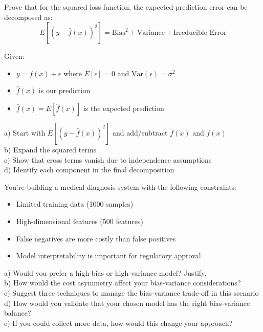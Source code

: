 \documentclass{article}
\newcounter{exercise}
\begin{document}
\begin{tcolorbox}[colback=gray!5!white,colframe=gray!75!black,title=Problem \stepcounter{exercise}: Derivation Challenge]

Prove that for the squared loss function, the expected prediction error can be decomposed as:
$$E[(y - \hat{f}(x))^2] = \text{Bias}^2 + \text{Variance} + \text{Irreducible Error}$$

Given:
\begin{itemize}
    \item $y = f(x) + \epsilon$ where $E[\epsilon] = 0$ and $\text{Var}(\epsilon) = \sigma^2$
    \item $\hat{f}(x)$ is our prediction
    \item $\bar{f}(x) = E[\hat{f}(x)]$ is the expected prediction
\end{itemize}

a) Start with $E[(y - \hat{f}(x))^2]$ and add/subtract $\bar{f}(x)$ and $f(x)$\\
b) Expand the squared terms\\
c) Show that cross terms vanish due to independence assumptions\\
d) Identify each component in the final decomposition
\end{tcolorbox}

\begin{tcolorbox}[colback=gray!5!white,colframe=gray!75!black,title=Problem \stepcounter{exercise}: Advanced Application]

You're building a medical diagnosis system with the following constraints:
\begin{itemize}
    \item Limited training data (1000 samples)
    \item High-dimensional features (500 features)
    \item False negatives are more costly than false positives
    \item Model interpretability is important for regulatory approval
\end{itemize}

a) Would you prefer a high-bias or high-variance model? Justify.\\
b) How would the cost asymmetry affect your bias-variance considerations?\\
c) Suggest three techniques to manage the bias-variance trade-off in this scenario\\
d) How would you validate that your chosen model has the right bias-variance balance?\\
e) If you could collect more data, how would this change your approach?
\end{tcolorbox}
\end{document}
